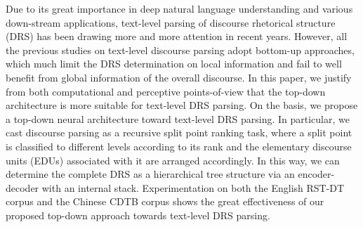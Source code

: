 Due to its great importance in deep natural language understanding and various down-stream applications, text-level parsing of discourse rhetorical structure (DRS) has been drawing more and more attention in recent years. However, all the previous studies on text-level discourse parsing adopt bottom-up approaches, which much limit the DRS determination on local information and fail to well benefit from global information of the overall discourse. In this paper, we justify from both computational and perceptive points-of-view that the top-down architecture is more suitable for text-level DRS parsing. On the basis, we propose a top-down neural architecture toward text-level DRS parsing. In particular, we cast discourse parsing as a recursive split point ranking task, where a split point is classified to different levels according to its rank and the elementary discourse units (EDUs) associated with it are arranged accordingly. In this way, we can determine the complete DRS as a hierarchical tree structure via an encoder-decoder with an internal stack. Experimentation on both the English RST-DT corpus and the Chinese CDTB corpus shows the great effectiveness of our proposed top-down approach towards text-level DRS parsing.
